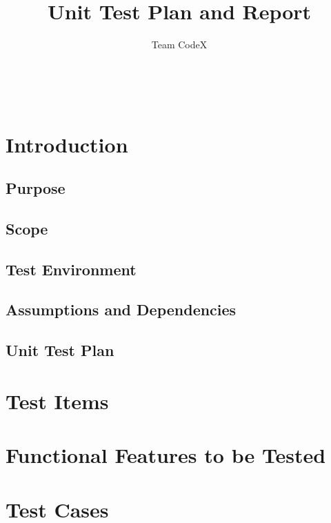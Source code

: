 \documentclass[11pt]{article}
\author{Team CodeX}
\title{Unit Test Plan and Report}
\begin{document}
	\setlength{\parskip}{6pt}
	
	
	
	\renewcommand{\thesection}{\arabic{section}}
	\newpage
	
	\tableofcontents
	
	\textsc{}\\[1cm]
	
	\newpage
	
	\section{Introduction}
	
		\subsection{Purpose}
		
		\subsection{Scope}
		
		\subsection{Test Environment}
		
		\subsection{Assumptions and Dependencies}
		
	\newpage	
		
	\begin{center}
		\section*{Unit Test Plan}
	\end{center}
	
	\section{Test Items}
	
	\section{Functional Features to be Tested}
	
	\section{Test Cases}
	
\end{document}
